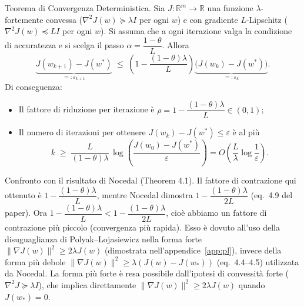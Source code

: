 \documentclass[a4paper,12pt]{article}
\begin{document}
\begin{thmbox}
  Teorema di Convergenza Deterministica.
  Sia $J: \mathbb{R}^m \to \mathbb{R}$ una funzione $\lambda$-fortemente convessa ($\nabla^2 J(w) \succeq \lambda I$ per ogni $w$) e con gradiente $L$-Lipschitz ($\nabla^2 J(w) \preceq LI$ per ogni $w$).
  Si assuma che a ogni iterazione valga la condizione di accuratezza e si scelga il passo 
  $\alpha = \dfrac{1-\theta}{L}$. Allora
  \[
  \underbrace{J(w_{k+1}) - J(w^*)}_{=: \varepsilon_{k+1}} \;\leq\; 
  \left(1 - \frac{(1-\theta)\lambda}{L}\right) \underbrace{\bigl(J(w_k) - J(w^*)\bigr)}_{=: \varepsilon_k}.
  \]
  Di conseguenza:
  \begin{itemize}
    \item Il fattore di riduzione per iterazione \`e $\rho = 1 - \dfrac{(1-\theta)\lambda}{L} \in (0,1)$;
    \item Il numero di iterazioni per ottenere $J(w_k) - J(w^*) \le \varepsilon$ \`e al pi\`u
    \[
    k \;\ge\; \frac{L}{(1-\theta)\lambda}\,\log\!\left(\frac{J(w_0)-J(w^*)}{\varepsilon}\right)
    = O\!\left(\frac{L}{\lambda}\log\frac{1}{\varepsilon}\right).
    \]
  \end{itemize}
\end{thmbox}

\begin{notebox}
  Confronto con il risultato di Nocedal (Theorem 4.1).
  Il fattore di contrazione qui ottenuto è $1 - \dfrac{(1-\theta)\lambda}{L}$, mentre Nocedal dimostra $1 - \dfrac{(1-\theta)\lambda}{2L}$ (eq.~4.9 del paper). Ora $1 - \dfrac{(1-\theta)\lambda}{L} < 1 - \dfrac{(1-\theta)\lambda}{2L}$, cioè abbiamo un fattore di contrazione più piccolo (convergenza più rapida). Esso è dovuto all'uso della disuguaglianza di Polyak--Lojasiewicz nella forma forte $\|\nabla J(w)\|^2 \ge 2\lambda J(w)$ (dimostrata nell'appendice~\ref{app:pl}), invece della forma più debole $\|\nabla J(w)\|^2 \ge \lambda(J(w)-J(w_*))$ (eq.~4.4--4.5) utilizzata da Nocedal. La forma più forte è resa possibile dall'ipotesi di convessità forte ($\nabla^2 J \succeq \lambda I$), che implica direttamente $\|\nabla J(w)\|^2 \ge 2\lambda J(w)$ quando $J(w_*)=0$.
\end{notebox}
\end{document}
